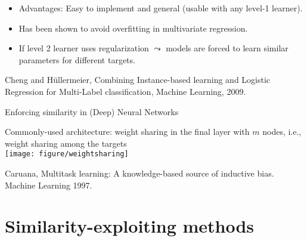 \documentclass[11pt,compress,t,notes=noshow, xcolor=table]{beamer}
\begin{document}
\begin{frame}
\begin{columns}
\begin{column}{5cm}
		\end{column}
	\end{columns}
%
	\begin{itemize}
		\item Advantages: Easy to implement and general (usable with any level-1 learner). 
		\item Has been shown to avoid overfitting in multivariate regression.
		\item If level 2 learner uses regularization $\leadsto$ models are forced to learn similar parameters for different targets.  
	\end{itemize}
	{\tiny Cheng and H\"ullermeier, Combining Instance-based learning and Logistic Regression for Multi-Label classification, Machine Learning, 2009.}
	
\end{frame}

\begin{frame}{Enforcing similarity in (Deep) Neural Networks}
	\small
	\begin{center}
		Commonly-used architecture: weight sharing in the final layer with $m$ nodes, i.e., weight sharing among the targets \\
		\vspace{0.2cm}
		\texttt{[image: figure/weightsharing]}
	\end{center}

{\tiny Caruana, Multitask learning: A knowledge-based source of inductive bias. Machine	Learning 1997.}
\end{frame}


\section{Similarity-exploiting methods}
\end{document}
